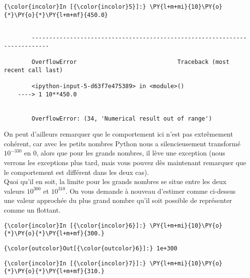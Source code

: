     \begin{Verbatim}[commandchars=\\\{\}]
{\color{incolor}In [{\color{incolor}5}]:} \PY{l+m+mi}{10}\PY{o}{*}\PY{o}{*}\PY{l+m+mf}{450.0}
\end{Verbatim}


    \begin{Verbatim}[commandchars=\\\{\}]

        ---------------------------------------------------------------------------

        OverflowError                             Traceback (most recent call last)

        <ipython-input-5-d63f7e475389> in <module>()
    ----> 1 10**450.0
    

        OverflowError: (34, 'Numerical result out of range')

    \end{Verbatim}

    On peut d'ailleurs remarquer que le comportement ici n'est pas
extrêmement cohérent, car avec les petits nombres Python nous a
silencieusement transformé \(10^{-330}\) en \(0\), alors que pour les
grands nombres, il lève une exception (nous verrons les exceptions plus
tard, mais vous pouvez dès maintenant remarquer que le comportement est
différent dans les deux cas).\\

    Quoi qu'il en soit, la limite pour les grands nombres se situe entre les
deux valeurs \(10^{300}\) et \(10^{310}\). On vous demande à nouveau
d'estimer comme ci-dessus une valeur approchée du plus grand nombre
qu'il soit possible de représenter comme un flottant.

    \begin{Verbatim}[commandchars=\\\{\}]
{\color{incolor}In [{\color{incolor}6}]:} \PY{l+m+mi}{10}\PY{o}{*}\PY{o}{*}\PY{l+m+mf}{300.}
\end{Verbatim}


\begin{Verbatim}[commandchars=\\\{\}]
{\color{outcolor}Out[{\color{outcolor}6}]:} 1e+300
\end{Verbatim}
            
    \begin{Verbatim}[commandchars=\\\{\}]
{\color{incolor}In [{\color{incolor}7}]:} \PY{l+m+mi}{10}\PY{o}{*}\PY{o}{*}\PY{l+m+mf}{310.}
\end{Verbatim}


